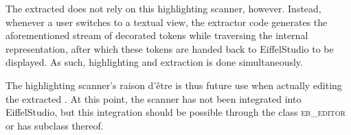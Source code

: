 The extracted \bon{} does not rely on this highlighting scanner, however. Instead, whenever a user switches to a textual \bon{} view, the extractor code generates the aforementioned stream of decorated tokens while traversing the internal \bon{} representation, after which these tokens are handed back to EiffelStudio to be displayed. As such, highlighting and extraction is done simultaneously.

The highlighting scanner's raison d'\^etre is thus future use when actually editing the extracted \bon{}. At this point, the scanner has not been integrated into EiffelStudio, but this integration should be possible through the class \textsc{eb\_editor} or has subclass thereof.